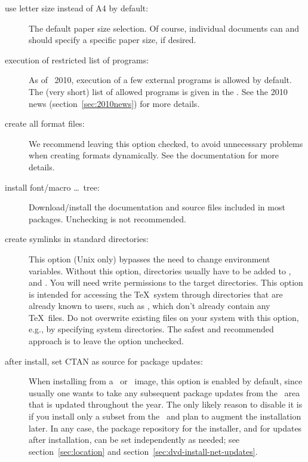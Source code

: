 \documentclass[12pt]{article}
\begin{document}
\begin{description}
\item[use letter size instead of A4 by default:] The default paper
  size selection.  Of course, individual documents can and should
  specify a specific paper size, if desired.

\item[execution of restricted list of programs:] As of \TL\ 2010,
  execution of a few external programs is allowed by default.  The (very
  short) list of allowed programs is given in the .
  See the 2010 news (section~\ref{sec:2010news}) for more details.

\item[create all format files:] We recommend leaving this option
  checked, to avoid unnecessary problems when creating formats
  dynamically.  See the  documentation for more details.

\item[install font/macro \ldots\ tree:] Download/install the
  documentation and source files included in most packages.  Unchecking
  is not recommended.

\item[create symlinks in standard directories:]
  This option (Unix only) bypasses the need to change environment
  variables. Without this option, \TL{} directories usually have to be
  added to ,  and . You
  will need write permissions to the target directories.  This option is
  intended for accessing the \TeX\ system through directories that are
  already known to users, such as , which don't
  already contain any \TeX\ files.  Do not overwrite existing files on
  your system with this option, e.g., by specifying system directories.
  The safest and recommended approach is to leave the option unchecked.

\item[after install, set CTAN as source for package updates:]
  When installing from a \DVD\ or \ISO\ image, this
  option is enabled by default, since usually one wants to take any
  subsequent package updates from the \CTAN\ area that is updated
  throughout the year.  The only likely reason to disable it is if you
  install only a subset from the \DVD\ and plan to augment the
  installation later.  In any case, the package repository for the
  installer, and for updates after installation, can be set
  independently as needed; see section~\ref{sec:location} and
  section~\ref{sec:dvd-install-net-updates}.
\end{description}
\end{document}
